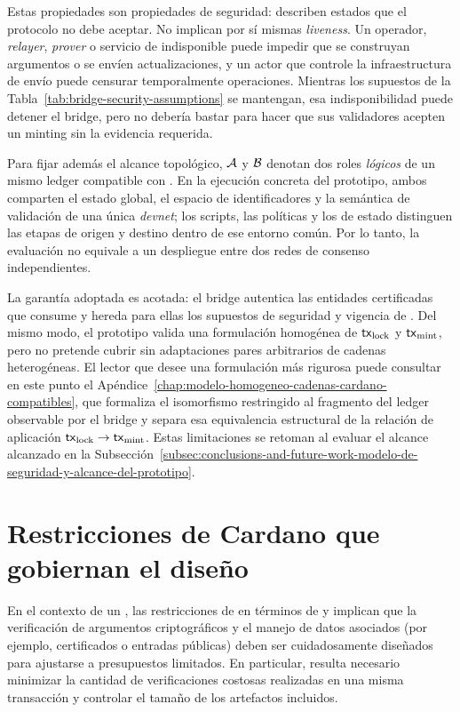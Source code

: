 Estas propiedades son propiedades de seguridad: describen estados que el protocolo no debe aceptar. No implican por sí mismas \textit{liveness}. Un operador, \textit{relayer}, \textit{prover} o servicio de \Mithril indisponible puede impedir que se construyan argumentos o se envíen actualizaciones, y un actor que controle la infraestructura de envío puede censurar temporalmente operaciones. Mientras los supuestos de la Tabla~\ref{tab:bridge-security-assumptions} se mantengan, esa indisponibilidad puede detener el bridge, pero no debería bastar para hacer que sus validadores acepten un minting sin la evidencia requerida.

Para fijar además el alcance topológico, $\mathcal{A}$ y $\mathcal{B}$ denotan dos roles \emph{lógicos} de un mismo ledger compatible con \Cardano. En la ejecución concreta del prototipo, ambos comparten el estado global, el espacio de identificadores y la semántica de validación \eUTxO de una única \textit{devnet}; los scripts, las políticas y los \UTxOs de estado distinguen las etapas de origen y destino dentro de ese entorno común. Por lo tanto, la evaluación no equivale a un despliegue entre dos redes de consenso independientes.

La garantía adoptada es acotada: el bridge autentica las entidades certificadas que consume y hereda para ellas los supuestos de seguridad y vigencia de \Mithril. Del mismo modo, el prototipo valida una formulación homogénea de $\mathsf{tx}_{\mathrm{lock}}$ y $\mathsf{tx}_{\mathrm{mint}}$, pero no pretende cubrir sin adaptaciones pares arbitrarios de cadenas heterogéneas. El lector que desee una formulación más rigurosa puede consultar en este punto el Apéndice~\ref{chap:modelo-homogeneo-cadenas-cardano-compatibles}, que formaliza el isomorfismo restringido al fragmento del ledger observable por el bridge y separa esa equivalencia estructural de la relación de aplicación $\mathsf{tx}_{\mathrm{lock}}\rightarrow\mathsf{tx}_{\mathrm{mint}}$. Estas limitaciones se retoman al evaluar el alcance alcanzado en la Subsección~\ref{subsec:conclusions-and-future-work-modelo-de-seguridad-y-alcance-del-prototipo}.

\section{Restricciones de Cardano que gobiernan el diseño}
\label{sec:design-decisions-restricciones-de-cardano-que-gobiernan-el-diseno}

En el contexto de un \zkBridge, las restricciones de \Cardano en términos de \maxTxSize y \maxTxExUnits implican que la verificación de argumentos criptográficos y el manejo de datos asociados (por ejemplo, certificados o entradas públicas) deben ser cuidadosamente diseñados para ajustarse a presupuestos limitados. En particular, resulta necesario minimizar la cantidad de verificaciones costosas realizadas en una misma transacción y controlar el tamaño de los artefactos incluidos.

